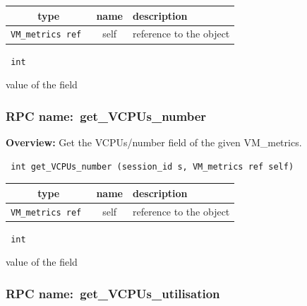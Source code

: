 
 
\vspace{0.3cm}
\begin{tabular}{|c|c|p{7cm}|}
 \hline
{\bf type} & {\bf name} & {\bf description} \\ \hline
{\tt VM\_metrics ref } & self & reference to the object \\ \hline 

\end{tabular}

\vspace{0.3cm}

{\tt 
int
}


value of the field
\vspace{0.3cm}
\vspace{0.3cm}
\vspace{0.3cm}
\subsubsection{RPC name:~get\_VCPUs\_number}

{\bf Overview:} 
Get the VCPUs/number field of the given VM\_metrics.

\begin{verbatim} int get_VCPUs_number (session_id s, VM_metrics ref self)\end{verbatim}



 
\vspace{0.3cm}
\begin{tabular}{|c|c|p{7cm}|}
 \hline
{\bf type} & {\bf name} & {\bf description} \\ \hline
{\tt VM\_metrics ref } & self & reference to the object \\ \hline 

\end{tabular}

\vspace{0.3cm}

{\tt 
int
}


value of the field
\vspace{0.3cm}
\vspace{0.3cm}
\vspace{0.3cm}
\subsubsection{RPC name:~get\_VCPUs\_utilisation}

